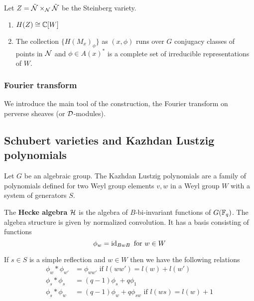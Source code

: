 \documentclass[12pt]{article}
\begin{document}
\begin{theorem}  Let $Z = \tilde {{\mathcal{N}}}\times_{\mathcal{N}} \tilde {{\mathcal{N}}}$ be the Steinberg variety.
    \begin{enumerate}
        \item $H(Z) \cong \mathbb{C}[W]$
        \item The collection $\{H(M_x)_\phi\}$ as $(x,\phi)$ runs over $G$ conjugacy
              classes of points in ${\mathcal{N}}$ and $\phi\in A(x)^*$ is a complete set of irreducible
              representations of $W$.
    \end{enumerate}
\end{theorem}

\subsubsection{Fourier transform}
We introduce the main tool of the construction, the Fourier transform
on perverse sheaves (or ${\mathcal{D}}$-modules).

\subsection{Schubert varieties and Kazhdan Lustzig polynomials}
Let $G$ be an algebraic group. The Kazhdan Lustzig polynomials are a family of polynomials defined for
two Weyl group elements $v,w$ in a Weyl group $W$ with a system of
generators $S$.

\begin{definition}
    The \textbf{Hecke algebra} ${\mathcal{H}}$ is the algebra of $B$-bi-invariant
    functions of $G(\mathbb{F}_q)$.
    The algebra structure is given by normalized convolution.
    It has a basis consisting of functions \[\phi_w = \operatorname{id}_{BwB} \text{ for } w\in W\]
\end{definition}



\begin{lemma}
    If $s\in S$ is a simple reflection and $w\in W$ then we have the following relations
    \begin{align*}
        \phi_w * \phi_{w'} & = \phi_{ww'} \text{ if } l(ww') = l(w) + l(w')          \\
        \phi_s * \phi_s    & = (q-1)\phi_s + q\phi_1                                 \\
        \phi_s * \phi_w    & = (q-1)\phi_w + q\phi_{sw} \text{ if } l(ws) = l(w) + 1
    \end{align*}
\end{lemma}
\end{document}
